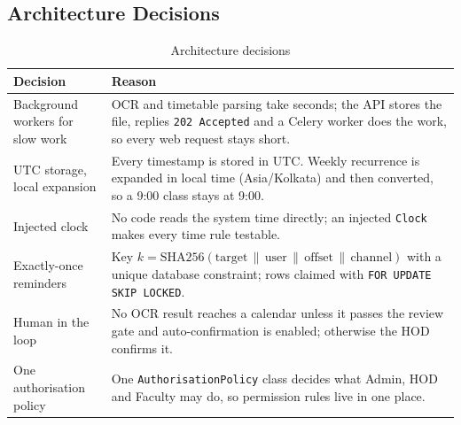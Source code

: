 \subsection{Architecture Decisions}
\begin{xltabular}{\textwidth}{|p{3.4cm}|Y|}
\caption{Architecture decisions}\\
\hline
\textbf{Decision} & \textbf{Reason} \\ \hline
Background workers for slow work & OCR and timetable parsing take seconds; the API stores the file, replies \texttt{202 Accepted} and a Celery worker does the work, so every web request stays short. \\ \hline
UTC storage, local expansion & Every timestamp is stored in UTC. Weekly recurrence is expanded in local time (Asia/Kolkata) and then converted, so a 9:00 class stays at 9:00. \\ \hline
Injected clock & No code reads the system time directly; an injected \texttt{Clock} makes every time rule testable. \\ \hline
Exactly-once reminders & Key $k = \mathrm{SHA256}(\text{target}\,\|\,\text{user}\,\|\,\text{offset}\,\|\,\text{channel})$ with a unique database constraint; rows claimed with \texttt{FOR UPDATE SKIP LOCKED}. \\ \hline
Human in the loop & No OCR result reaches a calendar unless it passes the review gate and auto-confirmation is enabled; otherwise the HOD confirms it. \\ \hline
One authorisation policy & One \texttt{AuthorisationPolicy} class decides what Admin, HOD and Faculty may do, so permission rules live in one place. \\ \hline
\end{xltabular}
